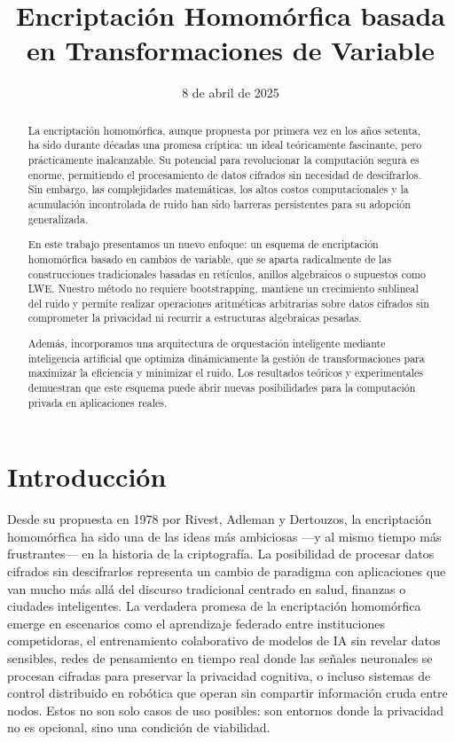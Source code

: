 \documentclass[11pt]{article}
\title{Encriptación Homomórfica basada en Transformaciones de Variable}
\author{}
\affil{Universidad Panamericana, Guadalajara, México}
\date{8 de abril de 2025}
\theoremstyle{plain}
\begin{document}
\maketitle

\begin{abstract}
La encriptación homomórfica, aunque propuesta por primera vez en los años setenta, ha sido durante décadas una promesa críptica: un ideal teóricamente fascinante, pero prácticamente inalcanzable. Su potencial para revolucionar la computación segura es enorme, permitiendo el procesamiento de datos cifrados sin necesidad de descifrarlos. Sin embargo, las complejidades matemáticas, los altos costos computacionales y la acumulación incontrolada de ruido han sido barreras persistentes para su adopción generalizada.

En este trabajo presentamos un nuevo enfoque: un esquema de encriptación homomórfica basado en cambios de variable, que se aparta radicalmente de las construcciones tradicionales basadas en retículos, anillos algebraicos o supuestos como LWE. Nuestro método no requiere bootstrapping, mantiene un crecimiento sublineal del ruido y permite realizar operaciones aritméticas arbitrarias sobre datos cifrados sin comprometer la privacidad ni recurrir a estructuras algebraicas pesadas. 

Además, incorporamos una arquitectura de orquestación inteligente mediante inteligencia artificial que optimiza dinámicamente la gestión de transformaciones para maximizar la eficiencia y minimizar el ruido. Los resultados teóricos y experimentales demuestran que este esquema puede abrir nuevas posibilidades para la computación privada en aplicaciones reales.
\end{abstract}

\section{Introducción}

Desde su propuesta en 1978 por Rivest, Adleman y Dertouzos, la encriptación homomórfica ha sido una de las ideas más ambiciosas —y al mismo tiempo más frustrantes— en la historia de la criptografía. La posibilidad de procesar datos cifrados sin descifrarlos representa un cambio de paradigma con aplicaciones que van mucho más allá del discurso tradicional centrado en salud, finanzas o ciudades inteligentes. La verdadera promesa de la encriptación homomórfica emerge en escenarios como el aprendizaje federado entre instituciones competidoras, el entrenamiento colaborativo de modelos de IA sin revelar datos sensibles, redes de pensamiento en tiempo real donde las señales neuronales se procesan cifradas para preservar la privacidad cognitiva, o incluso sistemas de control distribuido en robótica que operan sin compartir información cruda entre nodos. Estos no son solo casos de uso posibles: son entornos donde la privacidad no es opcional, sino una condición de viabilidad.
\end{document}
